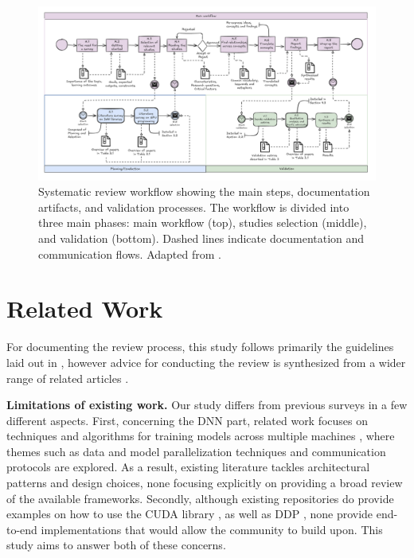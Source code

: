 


\begin{figure}[th]
	\centering
	\includegraphics[width=\linewidth]{figures/workflow2}
	\caption{Systematic review workflow showing the main steps, documentation artifacts, and validation processes.
		The workflow is divided into three main phases: main workflow (top), studies selection (middle), and
		validation (bottom). Dashed lines indicate documentation and communication flows. Adapted from \cite{dos_santos_sustainable_2024}.}
	\label{fig:workflow}
\end{figure}

\section{Related Work}
\label{sec:related_work}


For documenting the review process, this study follows primarily the guidelines laid out in
\cite{keele_systematic_2007}, however advice for conducting the review is synthesized from a wider
range of related articles
\cite{brereton_lessons_2007-1,kitchenham_procedures_nodate,budgen_reporting_2018,dos_santos_sustainable_2024}.

\textbf{Limitations of existing work.}
Our study differs from previous surveys in a few different aspects. First, concerning the DNN part,
related work focuses on techniques and algorithms for training models across multiple machines
\cite{dehghani_distributed_2023, chahal_hitchhikers_2018, berloco_systematic_2022}, where themes
such as data and model parallelization techniques and communication protocols are explored. As a
result, existing literature tackles architectural patterns and design choices, none focusing
explicitly on providing a broad review of the available frameworks. Secondly, although existing
repositories do provide examples on how to use the CUDA library
\cite{noauthor_nvidiacuda-samples_2025}, as well as DDP
\cite{noauthor_examplesdistributedddpreadmemd_nodate}, none provide end-to-end implementations that
would allow the community to build upon. This study aims to answer both of these concerns.

